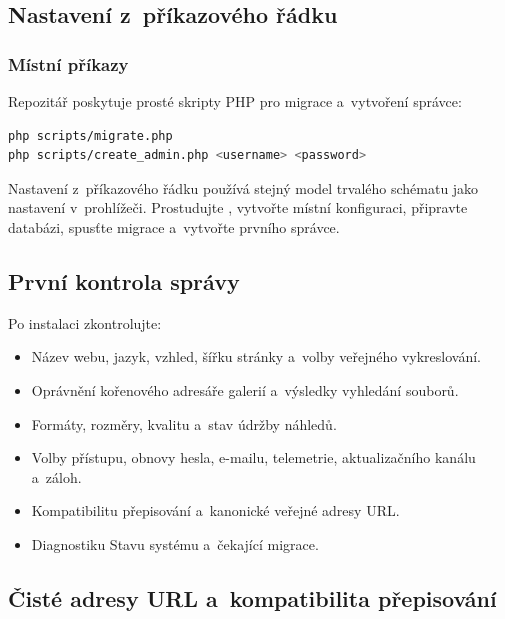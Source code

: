 \documentclass[11pt,a4paper]{article}
\newcommand{\filepath}[1]{\path{#1}}
\begin{document}
\subsection{Nastavení z~příkazového řádku}

\subsubsection{Místní příkazy}

Repozitář poskytuje prosté skripty PHP pro migrace a~vytvoření správce:

\begin{lstlisting}[language=bash]
php scripts/migrate.php
php scripts/create_admin.php <username> <password>
\end{lstlisting}

Nastavení z~příkazového řádku používá stejný model trvalého schématu jako
nastavení v~prohlížeči. Prostudujte \filepath{config.example.php}, vytvořte
místní konfiguraci, připravte databázi, spusťte migrace a~vytvořte prvního
správce.

\subsection{První kontrola správy}

Po instalaci zkontrolujte:

\begin{itemize}
  \item Název webu, jazyk, vzhled, šířku stránky a~volby veřejného vykreslování.
  \item Oprávnění kořenového adresáře galerií a~výsledky vyhledání souborů.
  \item Formáty, rozměry, kvalitu a~stav údržby náhledů.
  \item Volby přístupu, obnovy hesla, e-mailu, telemetrie, aktualizačního kanálu
  a~záloh.
  \item Kompatibilitu přepisování a~kanonické veřejné adresy URL.
  \item Diagnostiku Stavu systému a~čekající migrace.
\end{itemize}

\subsection{Čisté adresy URL a~kompatibilita přepisování}
\end{document}
